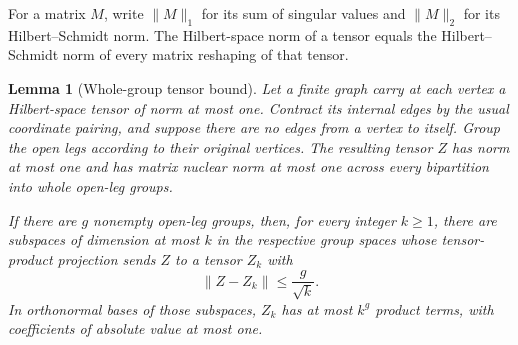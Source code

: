 \documentclass[11pt]{article}
\numberwithin{equation}{section}
\newtheorem{lemma}[theorem]{Lemma}
\theoremstyle{definition}
\theoremstyle{remark}
\begin{document}
For a matrix $M$, write $\lVert M\rVert_1$ for its
sum of singular values and $\lVert M\rVert_2$ for its Hilbert--Schmidt norm.  The
Hilbert-space norm of a tensor equals the Hilbert--Schmidt norm of every
matrix reshaping of that tensor.

\begin{lemma}[Whole-group tensor bound]\label{lem:group-tensor}
Let a finite graph carry at each vertex a Hilbert-space tensor of norm at
most one.  Contract its internal edges by the usual coordinate pairing,
and suppose there are no edges from a vertex to itself.  Group the open
legs according to their original vertices.  The resulting tensor $Z$ has
norm at most one and has matrix nuclear norm at most one across every
bipartition into whole open-leg groups.

If there are $g$ nonempty open-leg groups, then, for every integer $k\ge1$,
there are subspaces of dimension at most $k$ in the respective group spaces
whose tensor-product projection sends $Z$ to a tensor $Z_k$ with
\begin{equation}\label{eq:group-truncation}
 \lVert Z-Z_k\rVert\le\frac{g}{\sqrt{k}}.
\end{equation}
In orthonormal bases of those subspaces, $Z_k$ has at most $k^g$ product
terms, with coefficients of absolute value at most one.
\end{lemma}
\end{document}
